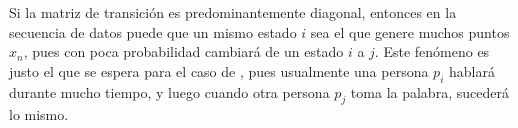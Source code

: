 Si la matriz de transición es predominantemente diagonal, entonces en la secuencia de datos puede que un mismo estado $i$ sea el que genere muchos puntos $x_n$, pues con poca probabilidad cambiará de un estado $i$ a $j$. Este fenómeno es justo el que se espera para el caso de \sd, pues usualmente una persona $p_i$ hablará durante mucho tiempo, y luego cuando otra persona $p_j$ toma la palabra, sucederá lo mismo.